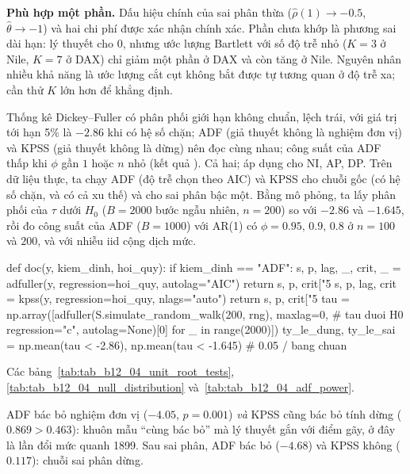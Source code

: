  \textbf{Phù hợp một phần.} Dấu hiệu chính của sai phân thừa ($\hat\rho(1)\to-0.5$, $\hat\theta\to-1$) và hai chi phí được xác nhận chính xác. Phần chưa khớp là phương sai dài hạn: lý thuyết cho $0$, nhưng ước lượng Bartlett với số độ trễ nhỏ ($K=3$ ở Nile, $K=7$ ở DAX) chỉ giảm một phần ở DAX và còn tăng ở Nile. Nguyên nhân nhiều khả năng là ước lượng cắt cụt không bắt được tự tương quan ở độ trễ xa; cần thử $K$ lớn hơn để khẳng định.

 Thống kê Dickey--Fuller có phân phối giới hạn không chuẩn, lệch trái, với giá trị tới hạn 5\% là $-2.86$ khi có hệ số chặn; ADF (giả thuyết không là nghiệm đơn vị) và KPSS (giả thuyết không là dừng) nên đọc cùng nhau; công suất của ADF thấp khi $\phi$ gần $1$ hoặc $n$ nhỏ (kết quả ).
 Cả hai; áp dụng cho NI, AP, DP. Trên dữ liệu thực, ta chạy ADF (độ trễ chọn theo AIC) và KPSS cho chuỗi gốc (có hệ số chặn, và có cả xu thế) và cho sai phân bậc một. Bằng mô phỏng, ta lấy phân phối của $\tau$ dưới $H_0$ ($B=2000$ bước ngẫu nhiên, $n=200$) so với $-2.86$ và $-1.645$, rồi đo công suất của ADF ($B=1000$) với AR(1) có $\phi=0.95,\,0.9,\,0.8$ ở $n=100$ và $200$, và với nhiễu iid cộng dịch mức.
\begin{codeblock}
def doc(y, kiem_dinh, hoi_quy):
    if kiem_dinh == "ADF":
        s, p, lag, _, crit, _ = adfuller(y, regression=hoi_quy, autolag="AIC")
        return s, p, crit["5%
    s, p, lag, crit = kpss(y, regression=hoi_quy, nlags="auto")
    return s, p, crit["5%
tau = np.array([adfuller(S.simulate_random_walk(200, rng), maxlag=0,       # tau duoi H0
                         regression="c", autolag=None)[0] for _ in range(2000)])
ty_le_dung, ty_le_sai = np.mean(tau < -2.86), np.mean(tau < -1.645)       # 0.05 / bang chuan
\end{codeblock}
 Các bảng~\ref{tab:tab_b12_04_unit_root_tests}, \ref{tab:tab_b12_04_null_distribution} và~\ref{tab:tab_b12_04_adf_power}.



 ADF bác bỏ nghiệm đơn vị ($-4.05$, $p=0.001$) \emph{và} KPSS cũng bác bỏ tính dừng ($0.869>0.463$): khuôn mẫu ``cùng bác bỏ'' mà lý thuyết gắn với điểm gãy, ở đây là lần đổi mức quanh 1899. Sau sai phân, ADF bác bỏ ($-4.68$) và KPSS không ($0.117$): chuỗi sai phân dừng.

